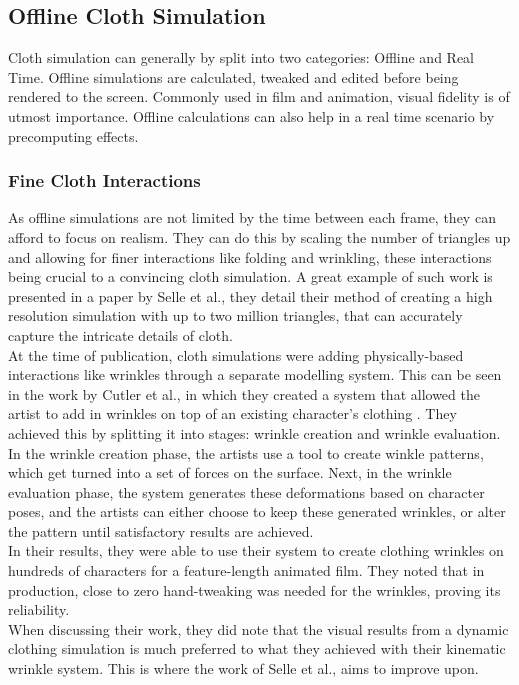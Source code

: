 \documentclass[12pt,a4paper]{article}
\begin{document}
\subsection{Offline Cloth Simulation} 
Cloth simulation can generally by split into two categories: Offline and Real Time. Offline simulations are calculated, tweaked and edited before being rendered to the screen. Commonly used in film and animation, visual fidelity is of utmost importance. Offline calculations can also help in a real time scenario by precomputing effects. \\

\subsubsection{Fine Cloth Interactions}
As offline simulations are not limited by the time between each frame, they can afford to focus on realism. They can do this by scaling the number of triangles up and allowing for finer interactions like folding and wrinkling, these interactions being crucial to a convincing cloth simulation. A great example of such work is presented in a paper by Selle et al., they detail their method of creating a high resolution simulation with up to two million triangles, that can accurately capture the intricate details of cloth. \cite{4522545}\\

At the time of publication, cloth simulations were adding physically-based interactions like wrinkles through a separate modelling system. This can be seen in the work by Cutler et al., in which they created a system that allowed the artist to add in wrinkles on top of an existing character's clothing \cite{10.1145/1073368.1073384}. They achieved this by splitting it into stages: wrinkle creation and wrinkle evaluation. In the wrinkle creation phase, the artists use a tool to create winkle patterns, which get turned into a set of forces on the surface. Next, in the wrinkle evaluation phase, the system generates these deformations based on character poses, and the artists can either choose to keep these generated wrinkles, or alter the pattern until satisfactory results are achieved.\\
In their results, they were able to use their system to create clothing wrinkles on hundreds of characters for a feature-length animated film. They noted that in production, close to zero hand-tweaking was needed for the wrinkles, proving its reliability.\\
When discussing their work, they did note that the visual results from a dynamic clothing simulation is much preferred to what they achieved with their kinematic wrinkle system. This is where the work of Selle et al., aims to improve upon. \\
\end{document}
